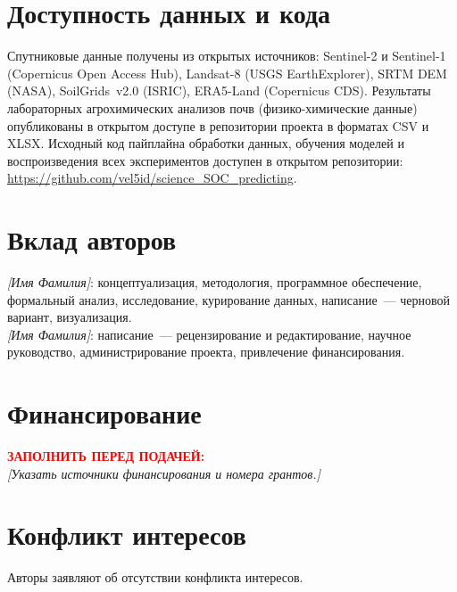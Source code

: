 \section*{Доступность данных и кода}

Спутниковые данные получены из открытых источников: Sentinel-2 и Sentinel-1 (Copernicus Open Access Hub), Landsat-8 (USGS EarthExplorer), SRTM DEM (NASA), SoilGrids~v2.0 (ISRIC), ERA5-Land (Copernicus CDS). Результаты лабораторных агрохимических анализов почв (физико-химические данные) опубликованы в открытом доступе в репозитории проекта в форматах CSV и XLSX. Исходный код пайплайна обработки данных, обучения моделей и воспроизведения всех экспериментов доступен в открытом репозитории: \url{https://github.com/vel5id/science_SOC_predicting}.

\section*{Вклад авторов}

\noindent \textit{[Имя Фамилия]}: концептуализация, методология, программное обеспечение, формальный анализ, исследование, курирование данных, написание~--- черновой вариант, визуализация. \\
\textit{[Имя Фамилия]}: написание~--- рецензирование и редактирование, научное руководство, администрирование проекта, привлечение финансирования.

\section*{Финансирование}

\noindent \textbf{\textcolor{red}{ЗАПОЛНИТЬ ПЕРЕД ПОДАЧЕЙ:}} \\[0.3em]
\noindent \textit{[Указать источники финансирования и номера грантов.]}

\section*{Конфликт интересов}

\noindent Авторы заявляют об отсутствии конфликта интересов.
